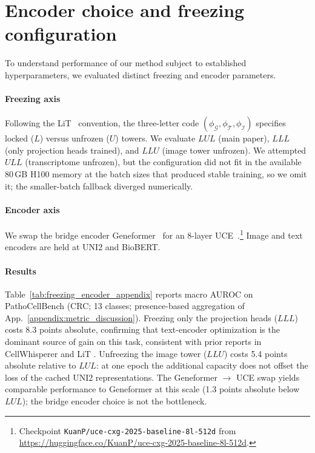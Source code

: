 
\section{Encoder choice and freezing configuration}\label{appendix:freezing_encoder}

To understand performance of our method subject to established
hyperparameters, we evaluated distinct freezing and encoder parameters.

\paragraph{Freezing axis}
Following the LiT~\citep{Zhai2021-ao} convention, the three-letter code
$(\phi_{\mathcal{G}}, \phi_{\mathcal{T}}, \phi_{\mathcal{I}})$ specifies
locked ($L$) versus unfrozen ($U$) towers. We evaluate $LUL$ (main paper),
$LLL$ (only projection heads trained), and $LLU$ (image tower unfrozen).
We attempted $ULL$ (transcriptome unfrozen), but the configuration did
not fit in the available 80\,GB H100 memory at the batch sizes that
produced stable training, so we omit it; the smaller-batch fallback
diverged numerically.

\paragraph{Encoder axis}
We swap the bridge encoder Geneformer~\citep{Theodoris2023-nt} for an
8-layer UCE~\citep{Rosen2023-uce}.\footnote{Checkpoint
\texttt{KuanP/uce-cxg-2025-baseline-8l-512d} from
\url{https://huggingface.co/KuanP/uce-cxg-2025-baseline-8l-512d}.}
Image and text encoders are held at UNI2 and BioBERT.

\paragraph{Results}
Table~\ref{tab:freezing_encoder_appendix} reports macro AUROC on
PathoCellBench (CRC; 13 classes; presence-based aggregation of
App.~\ref{appendix:metric_discussion}).
Freezing only the projection heads ($LLL$) costs 8.3 points absolute,
confirming that text-encoder optimization is the dominant source of gain
on this task, consistent with prior reports in CellWhisperer
\citep{Schaefer2025} and LiT \citep{Zhai2021-ao}.
Unfreezing the image tower ($LLU$) costs 5.4 points absolute relative to
$LUL$: at one epoch the additional capacity does not offset the loss of
the cached UNI2 representations.
The Geneformer $\to$ UCE swap yields comparable performance to Geneformer
at this scale (1.3 points absolute below $LUL$); the bridge encoder
choice is not the bottleneck.

